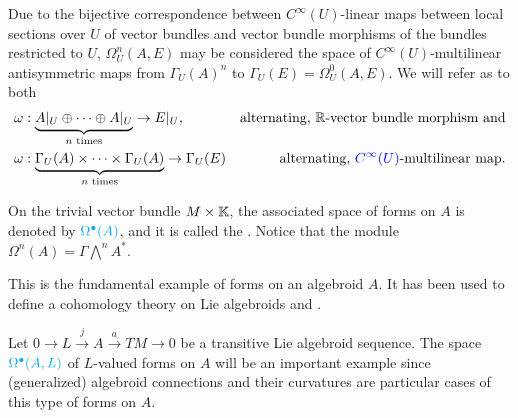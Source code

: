 \begin{remark}
Due to the bijective correspondence between $C^\infty(U)$-linear maps between local sections over $U$ of vector bundles and vector bundle morphisms of the bundles restricted to $U$, $\Omega_U^n(A, E)$ may be considered the space of $C^\infty(U)$-multilinear antisymmetric maps from $\Gamma_U(A)^n$ to $\Gamma_U(E) = \Omega_U^0(A, E)$. We will refer as  to both
\begin{align}
    \omega &: \underbrace{A|_U \oplus \cdots \oplus A|_U}_{\text{$n$ times}} \to E|_U, & \text{alternating, $\mathbb{R}$-vector bundle morphism and}\\
    \omega &: \underbrace{\Gamma_U(A) \times \cdots \times \Gamma_U(A)}_{\text{$n$ times}} \to \Gamma_U(E) & \text{alternating, \textcolor{blue}{$C^\infty(U)$}-multilinear map}.
\end{align}
    
    
\end{remark}

\lin



\begin{example}
On the trivial vector bundle $M \times \mathbb{K}$, the associated space of forms on $A$ is denoted by $\textcolor{cyan}{\textcolor{cyan}{\Omega^\bullet(A)}}$, and it is called the . Notice that the module $\Omega^n(A) = \Gamma \bigwedge^n A^*$.

This is the fundamental example of forms on an algebroid $A$. It has been used to define a cohomology theory on Lie algebroids and .
\end{example}

\begin{example}
Let $0 \to L \xrightarrow{j} A \xrightarrow{a} TM \to 0$ be a transitive Lie algebroid sequence.
The space $\textcolor{cyan}{\Omega^\bullet(A, L)}$ of $L$-valued forms on $A$ will be an important example since (generalized) algebroid connections and their curvatures are particular cases of this type of forms on $A$.
\end{example}


